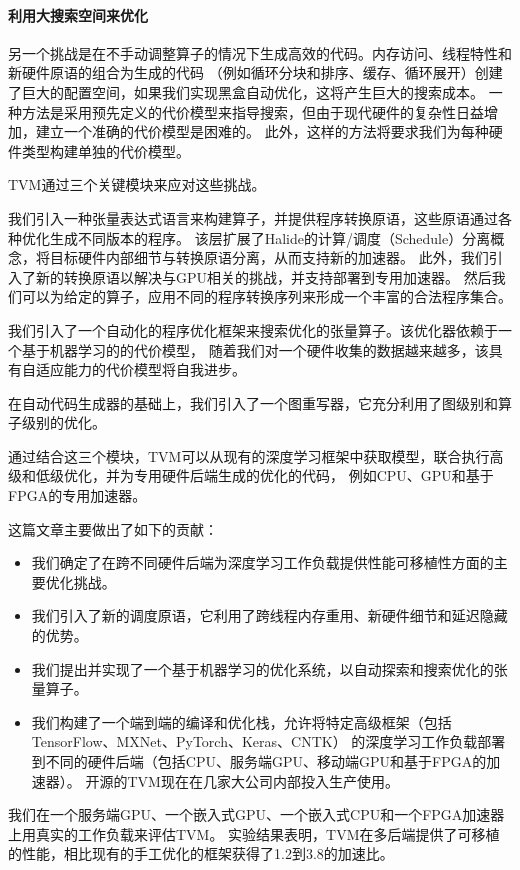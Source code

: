 \paragraph{利用大搜索空间来优化}
另一个挑战是在不手动调整算子的情况下生成高效的代码。内存访问、线程特性和新硬件原语的组合为生成的代码
（例如循环分块和排序、缓存、循环展开）创建了巨大的配置空间，如果我们实现黑盒自动优化，这将产生巨大的搜索成本。
一种方法是采用预先定义的代价模型来指导搜索，但由于现代硬件的复杂性日益增加，建立一个准确的代价模型是困难的。
此外，这样的方法将要求我们为每种硬件类型构建单独的代价模型。

TVM通过三个关键模块来应对这些挑战。
\begin{enumerate*}
    \item 我们引入一种张量表达式语言来构建算子，并提供程序转换原语，这些原语通过各种优化生成不同版本的程序。
    该层扩展了Halide的计算/调度（Schedule）分离概念，将目标硬件内部细节与转换原语分离，从而支持新的加速器。
    此外，我们引入了新的转换原语以解决与GPU相关的挑战，并支持部署到专用加速器。
    然后我们可以为给定的算子，应用不同的程序转换序列来形成一个丰富的合法程序集合。
    \item 我们引入了一个自动化的程序优化框架来搜索优化的张量算子。该优化器依赖于一个基于机器学习的的代价模型，
    随着我们对一个硬件收集的数据越来越多，该具有自适应能力的代价模型将自我进步。
    \item 在自动代码生成器的基础上，我们引入了一个图重写器，它充分利用了图级别和算子级别的优化。
\end{enumerate*} 

通过结合这三个模块，TVM可以从现有的深度学习框架中获取模型，联合执行高级和低级优化，并为专用硬件后端生成的优化的代码，
例如CPU、GPU和基于FPGA的专用加速器。

这篇文章主要做出了如下的贡献：

\begin{itemize}
    \item 我们确定了在跨不同硬件后端为深度学习工作负载提供性能可移植性方面的主要优化挑战。
    \item 我们引入了新的调度原语，它利用了跨线程内存重用、新硬件细节和延迟隐藏的优势。
    \item 我们提出并实现了一个基于机器学习的优化系统，以自动探索和搜索优化的张量算子。
    \item 我们构建了一个端到端的编译和优化栈，允许将特定高级框架（包括TensorFlow、MXNet、PyTorch、Keras、CNTK）
    的深度学习工作负载部署到不同的硬件后端（包括CPU、服务端GPU、移动端GPU和基于FPGA的加速器）。
    开源的TVM现在在几家大公司内部投入生产使用。
\end{itemize}

我们在一个服务端GPU、一个嵌入式GPU、一个嵌入式CPU和一个FPGA加速器上用真实的工作负载来评估TVM。
实验结果表明，TVM在多后端提供了可移植的性能，相比现有的手工优化的框架获得了1.2到3.8的加速比。
